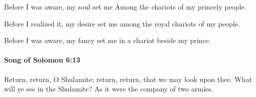 			\begin{versebox}
					\item[BHS] 
					\item[LXX] 
					\item[ASV] Before I was aware, my soul set me Among the chariots of my princely people.
					\item[NIV] Before I realized it, my desire set me among the royal chariots of my people.
					\item[NRSV] Before I was aware, my fancy set me in a chariot beside my prince.
			\end{versebox}

		\paragraph{Song of Solomon 6:13} %
			\label{SONGOFSOLOMON-6-13}

			Return, return, O Shulamite; return, return, that we may look upon thee. What will ye see in the Shulamite? As it were the company of two armies.

